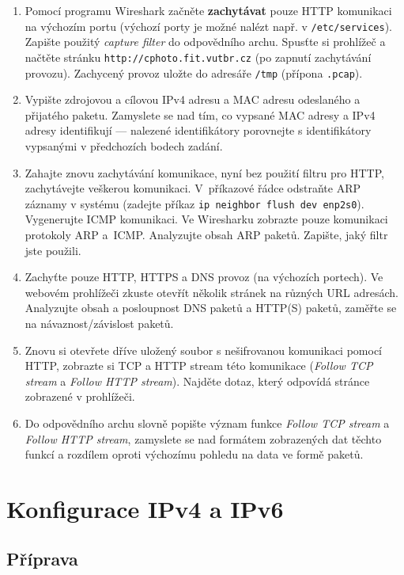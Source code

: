 \begin{enumerate}
  \item Pomocí programu Wireshark začněte \textbf{zachytávat} pouze HTTP komunikaci na výchozím portu
    (výchozí porty je možné nalézt např. v \texttt{/etc/services}). Zapište
    použitý \emph{capture filter} do odpovědního archu. Spusťte si prohlížeč a
    načtěte stránku \texttt{http://cphoto.fit.vutbr.cz} (po zapnutí zachytávání
    provozu). Zachycený provoz uložte do adresáře \texttt{/tmp} (přípona \texttt{.pcap}).
\item Vypište zdrojovou a cílovou IPv4 adresu a MAC adresu odeslaného a
  přijatého paketu. Zamyslete se nad tím, co vypsané MAC adresy a IPv4 adresy
    identifikují --- nalezené identifikátory porovnejte s identifikátory
    vypsanými v předchozích bodech zadání.
\item Zahajte znovu zachytávání komunikace, nyní bez použití filtru pro HTTP,
  zachytávejte veškerou komunikaci. V~příkazové řádce odstraňte ARP záznamy v systému
    (zadejte příkaz \texttt{ip neighbor flush dev enp2s0}). Vygenerujte ICMP komunikaci. Ve
    Wiresharku zobrazte pouze komunikaci
    protokoly ARP a~ICMP. Analyzujte obsah ARP paketů. Zapište, jaký filtr jste
    použili.
\item Zachyťte pouze HTTP, HTTPS a DNS provoz (na výchozích portech). Ve webovém prohlížeči zkuste otevřít několik stránek na různých URL adresách. Analyzujte obsah a posloupnost DNS paketů a HTTP(S) paketů, zaměřte se na návaznost/závislost paketů.

\item Znovu si otevřete dříve uložený soubor s nešifrovanou komunikaci pomocí
  HTTP, zobrazte si TCP a HTTP stream této komunikace (\emph{Follow TCP stream} a \emph{Follow HTTP stream}).
    Najděte dotaz, který odpovídá stránce zobrazené v prohlížeči.

\item Do odpovědního archu slovně popište význam funkce \emph{Follow TCP stream} a \emph{Follow HTTP stream},
    zamyslete se nad formátem zobrazených dat těchto funkcí
    a rozdílem oproti výchozímu pohledu na data ve formě paketů.
\end{enumerate}

\section{Konfigurace IPv4 a IPv6}

\subsection{Příprava}

